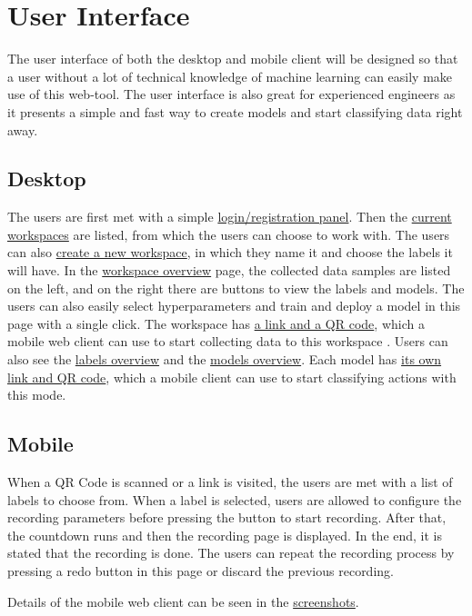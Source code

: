 \section{User Interface}
The user interface of both the desktop and mobile client will be designed so that a user without a lot of technical knowledge of machine learning can easily make use of this web-tool. The user interface is also great for experienced engineers as it presents a simple and fast way to create models and start classifying data right away.

\subsection{Desktop}
The users are first met with a simple \hyperref[fig:login]{login/registration panel}. Then the \hyperref[fig:workspaces-list]{current workspaces} are listed, from which the users can choose to work with. The users can also \hyperref[fig:create-workspace]{create a new workspace}, in which they name it and choose the labels it will have. In the \hyperref[fig:workspace-overview]{workspace overview} page, the collected data samples are listed on the left, and on the right there are buttons to view the labels and models. The users can also easily select hyperparameters and train and deploy a model in this page with a single click. The workspace has \hyperref[fig:workspace-link]{a link and a QR code}, which a mobile web client can use to start collecting data to this workspace . Users can also see the \hyperref[fig:labels-overview]{labels overview} and the \hyperref[fig:models-overview]{models overview}. Each model has \hyperref[fig:model-link]{its own link and QR code}, which a mobile client can use to start classifying actions with this mode.

\subsection{Mobile}
When a QR Code is scanned or a link is visited, the users are met with a list of labels to choose from. When a label is selected, users are allowed to configure the recording parameters before pressing the button to start recording. After that, the countdown runs and then the recording page is displayed. In the end, it is stated that the recording is done. The users can repeat the recording process by pressing a redo button in this page or discard the previous recording.

Details of the mobile web client can be seen in the \hyperref[fig:mobile]{screenshots}.

